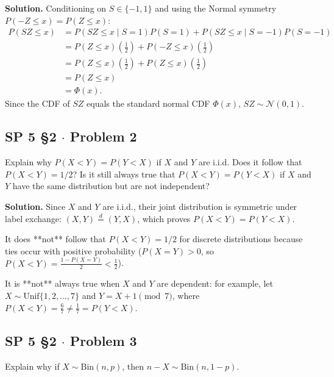 \documentclass[11pt,a4paper]{article}
\begin{document}
\noindent \textbf{Solution.} Conditioning on $S \in \{-1, 1\}$ and using the Normal symmetry $P(-Z \le x) = P(Z \le x)$:
\begin{align*}
P(SZ \le x) &= P(SZ \le x \mid S = 1) P(S = 1) + P(SZ \le x \mid S = -1) P(S = -1) \\
&= P(Z \le x) \left(\frac{1}{2}\right) + P(-Z \le x) \left(\frac{1}{2}\right) \\
&= P(Z \le x) \left(\frac{1}{2}\right) + P(Z \le x) \left(\frac{1}{2}\right) \\
&= P(Z \le x) \\
&= \Phi(x).
\end{align*}
Since the CDF of $SZ$ equals the standard normal CDF $\Phi(x)$, $SZ \sim \mathcal{N}(0, 1)$.

\vspace{10pt}
\subsection{SP 5 \S2 $\cdot$ Problem 2}
\begin{tcolorbox}[title={SP 5 \S2 $\cdot$ Problem 2}]
Explain why $P(X < Y) = P(Y < X)$ if $X$ and $Y$ are i.i.d. Does it follow that $P(X < Y) = 1/2$? Is it still always true that $P(X < Y) = P(Y < X)$ if $X$ and $Y$ have the same distribution but are not independent?
\end{tcolorbox}

\noindent \textbf{Solution.} Since $X$ and $Y$ are i.i.d., their joint distribution is symmetric under label exchange: $(X, Y) \stackrel{d}{=} (Y, X)$, which proves $P(X < Y) = P(Y < X)$. 

It does **not** follow that $P(X < Y) = 1/2$ for discrete distributions because ties occur with positive probability ($P(X = Y) > 0$, so $P(X < Y) = \frac{1 - P(X = Y)}{2} < \frac{1}{2}$). 

It is **not** always true when $X$ and $Y$ are dependent: for example, let $X \sim \text{Unif}\{1, 2, \dots, 7\}$ and $Y = X + 1 \pmod 7$, where $P(X < Y) = \frac{6}{7} \neq \frac{1}{7} = P(Y < X)$.

\vspace{10pt}
\subsection{SP 5 \S2 $\cdot$ Problem 3}
\begin{tcolorbox}[title={SP 5 \S2 $\cdot$ Problem 3}]
Explain why if $X \sim \text{Bin}(n, p)$, then $n - X \sim \text{Bin}(n, 1-p)$.
\end{tcolorbox}
\end{document}
